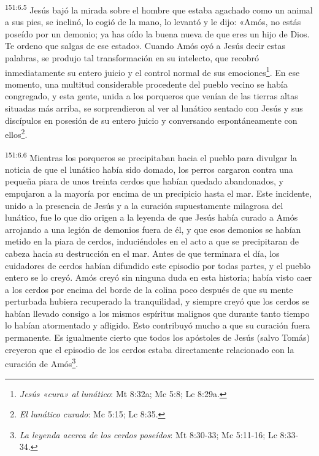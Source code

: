 \par 
\textsuperscript{151:6.5} Jesús bajó la mirada sobre el hombre que estaba agachado como un animal a sus pies, se inclinó, lo cogió de la mano, lo levantó y le dijo: «Amós, no estás poseído por un demonio; ya has oído la buena nueva de que eres un hijo de Dios. Te ordeno que salgas de ese estado». Cuando Amós oyó a Jesús decir estas palabras, se produjo tal transformación en su intelecto, que recobró inmediatamente su entero juicio y el control normal de sus emociones\footnote{\textit{Jesús «cura» al lunático}: Mt 8:32a; Mc 5:8; Lc 8:29a.}. En ese momento, una multitud considerable procedente del pueblo vecino se había congregado, y esta gente, unida a los porqueros que venían de las tierras altas situadas más arriba, se sorprendieron al ver al lunático sentado con Jesús y sus discípulos en posesión de su entero juicio y conversando espontáneamente con ellos\footnote{\textit{El lunático curado}: Mc 5:15; Lc 8:35.}.

\par 
\textsuperscript{151:6.6} Mientras los porqueros se precipitaban hacia el pueblo para divulgar la noticia de que el lunático había sido domado, los perros cargaron contra una pequeña piara de unos treinta cerdos que habían quedado abandonados, y empujaron a la mayoría por encima de un precipicio hasta el mar. Este incidente, unido a la presencia de Jesús y a la curación supuestamente milagrosa del lunático, fue lo que dio origen a la leyenda de que Jesús había curado a Amós arrojando a una legión de demonios fuera de él, y que esos demonios se habían metido en la piara de cerdos, induciéndoles en el acto a que se precipitaran de cabeza hacia su destrucción en el mar. Antes de que terminara el día, los cuidadores de cerdos habían difundido este episodio por todas partes, y el pueblo entero se lo creyó. Amós creyó sin ninguna duda en esta historia; había visto caer a los cerdos por encima del borde de la colina poco después de que su mente perturbada hubiera recuperado la tranquilidad, y siempre creyó que los cerdos se habían llevado consigo a los mismos espíritus malignos que durante tanto tiempo lo habían atormentado y afligido. Esto contribuyó mucho a que su curación fuera permanente. Es igualmente cierto que todos los apóstoles de Jesús (salvo Tomás) creyeron que el episodio de los cerdos estaba directamente relacionado con la curación de Amós\footnote{\textit{La leyenda acerca de los cerdos poseídos}: Mt 8:30-33; Mc 5:11-16; Lc 8:33-34.}.

